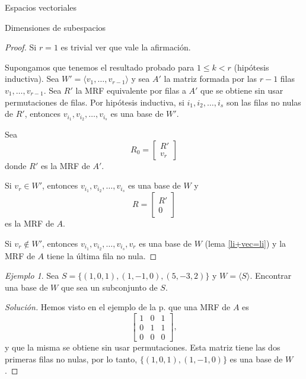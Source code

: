 \documentclass[a4paper,12pt,twoside,spanish,reqno]{amsbook}
\numberwithin{equation}{section}
\theoremstyle{definition}
\theoremstyle{remark}
\newtheorem*{ejemplo*}{Ejemplo}
\begin{document}
\begin{chapter}{Espacios vectoriales}
\begin{section}{Dimensiones de subespacios}
\begin{proof}
        Si $r = 1$ es trivial ver que vale la afirmación. 
        
        Supongamos que tenemos el resultado probado para $1\le k < r$ (hipótesis inductiva). 		
        Sea $W' = \langle  v_1,\ldots, v_{r-1} \rangle$ y sea $A'$ la matriz formada por las $r-1$ filas $v_1,\ldots, v_{r-1}$. 		
        Sea $R'$ la MRF equivalente por filas a $A'$ que se obtiene sin usar permutaciones de filas. Por hipótesis inductiva, si $i_1,i_2,\ldots,i_s$ son las filas no nulas de $R'$,  entonces $v_{i_1},v_{i_2},\ldots,v_{i_s}$ es una base de $W'$.
        
        Sea
        \begin{equation*}
            R_0 = \begin{bmatrix}
            R' \\ v_r
            \end{bmatrix}
        \end{equation*}
        donde $R'$ es la MRF de $A'$. 
        
        Si $v_r \in W'$, entonces  $v_{i_1},v_{i_2},\ldots,v_{i_s}$ es una base de $W$ y 
        \begin{equation*}
        R = \begin{bmatrix}
        R' \\ 0
        \end{bmatrix}
        \end{equation*}
        es la MRF de $A$.
        
        Si $v_r \not\in W'$, entonces  $v_{i_1},v_{i_2},\ldots,v_{i_s}, v_r$ es una base de $W$ (lema \ref{li+vec=li}) y la MRF de $A$ tiene la última fila no nula.  
    \end{proof}


    \begin{ejemplo*}
        Sea $S = \{(1,0,1),(1,-1,0), (5,-3,2)\}$ y $W = \langle S\rangle$. Encontrar una base de $W$ que sea un subconjunto de $S$. 
    \end{ejemplo*}
    \begin{proof}[Solución] Hemos visto en el ejemplo de la p. \pageref{ej-4.5} que una  MRF de $A$  es 
        \begin{equation*}
            \begin{bmatrix} 1&0&1\\0&1&1\\0&0&0 \end{bmatrix},
        \end{equation*}
        y que la misma se obtiene sin usar permutaciones. Esta matriz tiene las dos primeras filas no nulas, por lo tanto, $\{(1,0,1),(1,-1,0)\}$ es una base de $W$.
    \end{proof}


\end{section}
\end{chapter}
\end{document}
